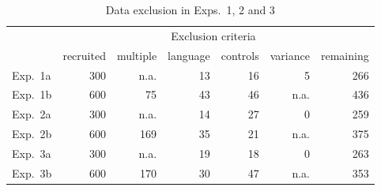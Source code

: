 \documentclass[11pt,fleqn]{article}
\newcommand{\6}{\mbox{$[\hspace*{-.6mm}[$}}
\newcommand{\9}{\mbox{$]\hspace*{-.6mm}]$}}
\begin{document}
\begin{table}[h!]
\centering
\begin{tabular}{l r | r r r r | r}
&  & \multicolumn{4}{c|}{Exclusion criteria} &  \\ 
&  recruited & multiple & language & controls & variance & remaining \\ 
\hline
Exp.~1a & 300 & n.a. & 13 & 16 & 5 & 266 \\
Exp.~1b & 600 & 75 & 43 & 46 & n.a. & 436 \\
Exp.~2a & 300 & n.a. & 14 & 27 & 0 & 259 \\
Exp.~2b & 600 & 169 & 35 & 21  & n.a. & 375 \\
Exp.~3a & 300 & n.a. & 19 & 18 & 0 & 263 \\
Exp.~3b & 600 & 170 & 30 & 47 & n.a. & 353 \\
\end{tabular}
\caption{Data exclusion in Exps.~1, 2 and 3}\label{f-exclusion}
\end{table}
\end{document}
